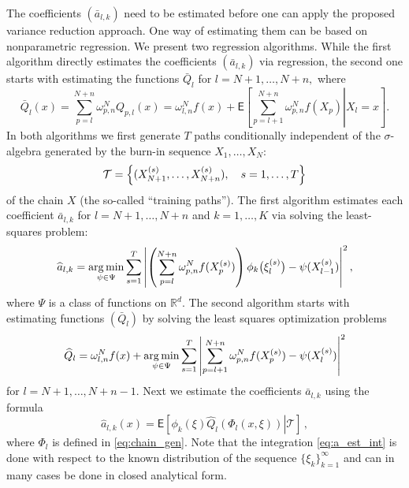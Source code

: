 \documentclass[aap,preprint]{imsart}
\def\NtrainPath{T}
\def\TrainSet{\mathcal{T}}
\newcommand*{\argmin}{\operatornamewithlimits{arg\,min}}
\begin{document}
The coefficients \((\bar a_{l,k})\) need to be estimated before one can apply the proposed variance reduction approach. One way of estimating them can be based on nonparametric regression.
We present two regression algorithms. While the first algorithm directly estimates  the coefficients \((\bar a_{l,k})\) via regression, the second one starts with estimating the functions $\bar{Q}_{l}$ for $l=N+1,\ldots,N+n,$ where
\begin{equation*}
\bar{Q}_{l}(x)=\sum_{p=l}^{N+n} \omega_{p,n}^{N} Q_{p,l}\left(x\right)=\omega_{l,n}^{N}f(x)+\mathsf{E}\left[\left.\sum_{p=l+1}^{N+n}\omega_{p,n}^{N}f(X_{p})\right|X_{l}=x\right] .
\end{equation*}
In both algorithms we first generate \(\NtrainPath\)  paths conditionally independent of the $\sigma$-algebra generated by the burn-in sequence $X_1,\dots,X_N$:
\[
\TrainSet=\Bigl\{(X^{(s)}_{N+1},\ldots,X^{(s)}_{N+n}),\quad s=1,\ldots,\NtrainPath\Bigr\}
\]
of the chain \(X\)
(the so-called ``training paths'').
The first algorithm estimates each coefficient \(\bar a_{l,k}\) for $l=N+1,\dots, N+n$  and $k=1,\dots,K$  via solving the least-squares problem:
\begin{equation}\label{eq:est_a_direct}
\widehat a_{l,k}=\argmin_{\psi\in \Psi}\sum_{s=1}^{\NtrainPath} \left | \left(\sum_{p=l}^{N+n}\omega_{p,n}^{N}f(X^{(s)}_{p})\right)\phi_k\bigl(\xi^{(s)}_{l}\bigr)-\psi(X^{(s)}_{l-1})\right|^2,
\end{equation}
where \(\Psi\) is a  class of  functions on \(\mathbb{R}^d.\)
The second algorithm starts with estimating  functions \((\bar Q_{l})\) by solving  the least squares optimization problems
\begin{equation}\label{eq:06042018a1}
{\widehat  Q}_{l}=\omega_{l,n}^{N}f(x)+\argmin_{\psi\in \Psi}\sum_{s=1}^{\NtrainPath} \left | \sum_{p=l+1}^{N+n}\omega_{p,n}^{N}f(X^{(s)}_{p})-\psi(X^{(s)}_{l})\right|^2
\end{equation}
for \(l=N+1,\ldots, N+n-1.\)
Next  we estimate the coefficients \( \bar a_{l,k}\) using
the formula
\begin{equation}
\label{eq:a_est_int}
\widehat a_{l,k}(x)=\mathsf{E}\left[\left.\phi_k\left(\xi\right)\widehat Q_{l}\left(\Phi_l(x,\xi)\right)\right | \TrainSet\right] \,,
\end{equation}
where $\Phi_l$ is defined in \eqref{eq:chain_gen}. Note that the integration \eqref{eq:a_est_int} is done with respect to the known distribution of the sequence $\{\xi_k\}_{k=1}^\infty$ and can in many cases be done in closed analytical form.
\end{document}
